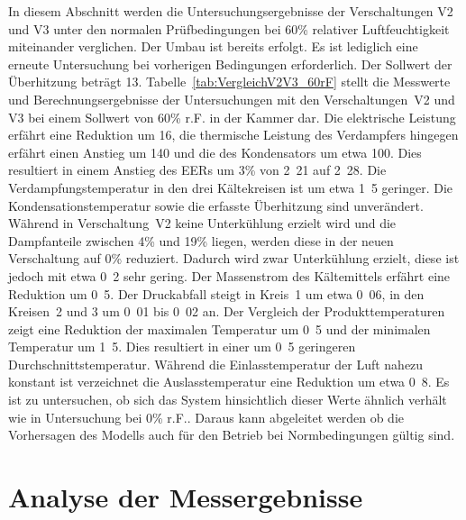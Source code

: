 In diesem Abschnitt werden die Untersuchungsergebnisse der Verschaltungen V2 und V3 unter den normalen Prüfbedingungen bei \unit{60}{\%} relativer Luftfeuchtigkeit miteinander verglichen. Der Umbau ist bereits erfolgt. Es ist lediglich eine erneute Untersuchung bei vorherigen Bedingungen erforderlich. Der Sollwert der Überhitzung beträgt \unit{13}{\kelvin}. \newline
Tabelle~\ref{tab:VergleichV2V3_60rF} stellt die Messwerte und Berechnungsergebnisse der Untersuchungen mit den Verschaltungen~V2 und V3 bei einem Sollwert von \unit{60}{\%} r.F. in der Kammer dar. Die elektrische Leistung erfährt eine Reduktion um \unit{16}{\watt}, die thermische Leistung des Verdampfers hingegen erfährt einen Anstieg um \unit{140}{\watt} und die des Kondensators um etwa \unit{100}{\watt}. Dies resultiert in einem Anstieg des EERs um \unit{3}{\%} von \unit{2.21}{} auf \unit{2.28}{}.
Die Verdampfungstemperatur in den drei Kältekreisen ist um etwa \unit{1.5}{\kelvin} geringer. Die Kondensationstemperatur sowie die erfasste Überhitzung sind unverändert.
Während in Verschaltung~V2 keine Unterkühlung erzielt wird und die Dampfanteile zwischen \unit{4}{\%} und \unit{19}{\%} liegen, werden diese in der neuen Verschaltung auf \unit{0}{\%} reduziert. Dadurch wird zwar Unterkühlung erzielt, diese ist jedoch mit etwa \unit{0.2}{\kelvin} sehr gering. Der Massenstrom des Kältemittels erfährt eine Reduktion um \unit{0.5}{\gram\per\second}. Der Druckabfall steigt in Kreis~1 um etwa \unit{0.06}{\bbar}, in den Kreisen~2 und 3 um \unit{0.01}{\bbar} bis \unit{0.02}{\bbar} an. Der Vergleich der Produkttemperaturen zeigt eine Reduktion der maximalen Temperatur um \unit{0.5}{\kelvin} und der minimalen Temperatur um \unit{1.5}{\kelvin}. Dies resultiert in einer um \unit{0.5}{\kelvin} geringeren Durchschnittstemperatur.
Während die Einlasstemperatur der Luft nahezu konstant ist verzeichnet die Auslasstemperatur eine Reduktion um etwa \unit{0.8}{\kelvin}.
Es ist zu untersuchen, ob sich das System hinsichtlich dieser Werte ähnlich verhält wie in Untersuchung bei \unit{0}{\%} r.F.. Daraus kann abgeleitet werden ob die Vorhersagen des Modells auch für den Betrieb bei Normbedingungen gültig sind.






\chapter{Analyse der Messergebnisse}
\label{cha:Analyse der Messergebnisse}

